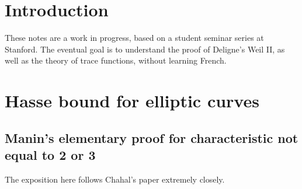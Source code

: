 \section{Introduction}

These notes are a work in progress, based on a student seminar series at Stanford. The eventual goal is to understand the proof of Deligne's Weil II, as well as the theory of trace functions, without learning French.

\section{Hasse bound for elliptic curves}

\subsection{Manin's elementary proof for characteristic not equal to 2 or 3}

The exposition here follows Chahal's paper \cite{chahal-manin} extremely closely.

